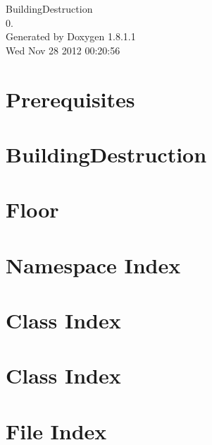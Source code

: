 \documentclass{book}
\begin{document}
\hypersetup{pageanchor=false,citecolor=blue}
\begin{titlepage}
\vspace*{7cm}
\begin{center}
{\Large Building\-Destruction \\[1ex]\large 0. }\\
\vspace*{1cm}
{\large Generated by Doxygen 1.8.1.1}\\
\vspace*{0.5cm}
{\small Wed Nov 28 2012 00:20:56}\\
\end{center}
\end{titlepage}
\clearemptydoublepage
{}
\tableofcontents
\clearemptydoublepage
{}
\hypersetup{pageanchor=true,citecolor=blue}
\chapter{Prerequisites}
\label{md_Prerequisites}
\hypertarget{md_Prerequisites}{}

\chapter{Building\-Destruction}
\label{md_README}
\hypertarget{md_README}{}

\chapter{Floor}
\label{md_Talk_to_Gus}
\hypertarget{md_Talk_to_Gus}{}

\chapter{Namespace Index}

\chapter{Class Index}

\chapter{Class Index}

\chapter{File Index}

\end{document}
